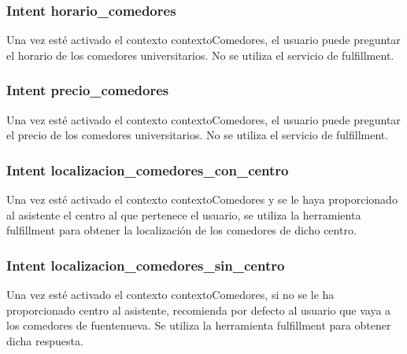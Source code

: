 \vspace{5 mm}

\subsubsection{Intent horario_comedores}

\vspace{5 mm}

Una vez esté activado el contexto contextoComedores, el usuario puede preguntar el horario de los comedores universitarios. No se utiliza el servicio de fulfillment.

\vspace{5 mm}

\subsubsection{Intent precio_comedores}

\vspace{5 mm}

Una vez esté activado el contexto contextoComedores, el usuario puede preguntar el precio de los comedores universitarios. No se utiliza el servicio de fulfillment.

\vspace{5 mm}

\subsubsection{Intent localizacion_comedores_con_centro}

\vspace{5 mm}

Una vez esté activado el contexto contextoComedores y se le haya proporcionado al asistente el centro al que pertenece el usuario, se utiliza la herramienta fulfillment para obtener la localización de los comedores de dicho centro.

\vspace{5 mm}

\subsubsection{Intent localizacion_comedores_sin_centro}

\vspace{5 mm}

Una vez esté activado el contexto contextoComedores, si no se le ha proporcionado centro al asistente, recomienda por defecto al usuario que vaya a los comedores de fuentenueva. Se utiliza la herramienta fulfillment para obtener dicha respuesta.

